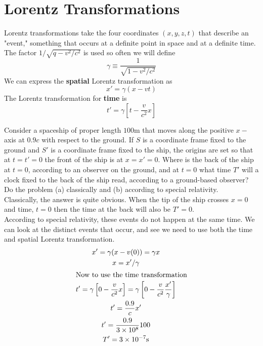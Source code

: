\section{Lorentz Transformations}
Lorentz transformations take the four coordinates $ (x,y,z,t) $ that describe an "event," something that occurs at a definite point in space and at a definite time. \\ 
The factor $ 1/\sqrt{q - v^2 /c^2} $ is used so often we will define
\[ \gamma  \equiv \dfrac{1}{\sqrt{1-v^2/c^2}} \]
We can express the \textbf{spatial} Lorentz transformation as
\[ x' = \gamma (x-vt) \]
The Lorentz transformation for \textbf{time} is
\[ t' = \gamma \left[t - \dfrac{v}{c^2}x\right] \]
\begin{example}
	Consider a spaceship of proper length $ 100 $m that moves along the positive $ x- $axis at $ 0.9c $ with respect to the ground. If $ S $ is a coordinate frame fixed to the ground and $ S' $ is a coordinate frame fixed to the ship, the origins are set so that at $ t = t' = 0$ the front of the ship is at $ x = x' =0 $. Where is the back of the ship at $ t = 0 $, according to an observer on the ground, and at $ t = 0 $ what time $ T' $ will a clock fixed to the back of the ship read, according to a ground-based observer? Do the problem (a) classically and (b) according to special relativity.  \\
	Classically, the answer is quite obvious. When the tip of the ship crosses $ x = 0 $ and time, $ t = 0 $ then the time at the back will also be $ T' =0 $. \\
	According to special relativity, these events do not happen at the same time. We can look at the distinct events that occur, and see we need to use both the time and spatial Lorentz transformation. 
	\begin{gather*}
		x' = \gamma(x-v(0))= \gamma x \\
		x = x'/\gamma \\
		\intertext{Now to use the time transformation}
		t' = \gamma\left[0 - \dfrac{v}{c^2}x\right] = \gamma\left[0 - \dfrac{v}{c^2} \dfrac{x'}{\gamma}\right] \\
		t' = \dfrac{0.9}{c} x' \\
		t' = \dfrac{0.9}{3 \times 10^{8}} 100 \\
		T' = 3 \times 10^{-7} \mbox{s}
	\end{gather*}
\end{example}